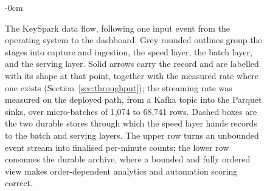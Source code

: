 \begin{figure}[H]
\begin{adjustwidth}{-\extralength}{0cm}
{}\end{adjustwidth}
\caption{The KeySpark data flow, following one input event from the operating
system to the dashboard. Grey rounded outlines group the stages into capture
and ingestion, the speed layer, the batch layer, and the serving layer. Solid
arrows carry the record and are labelled with its shape at that point, together
with the measured rate where one exists (Section~\ref{sec:throughput}); the
streaming rate was measured on the deployed path, from a Kafka topic into the
Parquet sinks, over micro-batches of 1,074 to 68,741 rows. Dashed boxes are the two durable stores
through which the speed layer hands records to the batch and serving layers.
The upper row turns an unbounded event stream into finalised per-minute counts;
the lower row consumes the durable archive, where a bounded and fully ordered
view makes order-dependent analytics and automation scoring correct.}
\label{fig:dataflow}
\end{figure}
